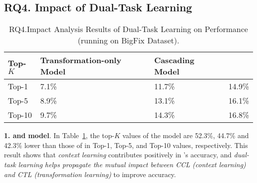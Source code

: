 \subsection{\bf RQ4. Impact of Dual-Task Learning}
\label{rq4:sec}


\begin{table}[t]
  \caption{RQ4.Impact Analysis Results of Dual-Task Learning on Performance (running on BigFix Dataset).}
  \vspace{-6pt}
	{\small
	  \begin{center}
            \tabcolsep 3pt
			\renewcommand{\arraystretch}{1}
			\begin{tabular}{p{1cm}<{\centering}|p{3.2cm}<{\centering}|p{2cm}<{\centering}|p{1cm}<{\centering}}
				\hline
				Top-$K$ & Transformation-only Model & Cascading Model &  \tool \\			
				\hline
				Top-1   & 7.1\% & 11.7\% & 14.9\% \\ \hline
				Top-5	& 8.9\% & 13.1\% & 16.1\% \\ \hline
				Top-10	& 9.7\% & 14.3\% & 16.8\%\\ \hline
			
				\hline
			\end{tabular}
			\label{fig:rq4_results}
		\end{center}
	}
\end{table}



{\bf 1. {\tool} and 
  model}. In Table~\ref{fig:rq4_results}, the top-$K$ values
of the  model are 52.3\%, 44.7\% and 42.3\%
lower than those of {\tool} in Top-1, Top-5, and Top-10 values,
respectively. This result shows that {\em context learning}
contributes positively in {\tool}'s accuracy, and {\em dual-task
  learning helps propagate the mutual impact between CCL (context
  learning) and CTL (transformation learning)} to improve accuracy.



